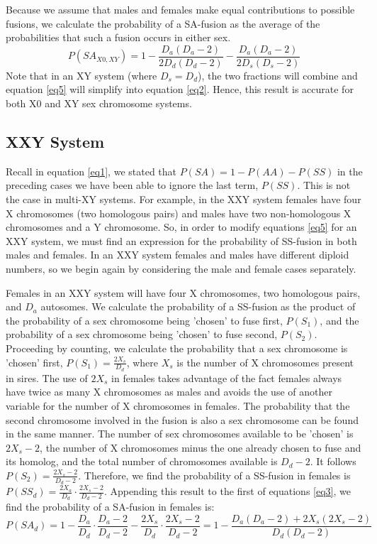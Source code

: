 \documentclass[12pt]{article}
\begin{document}
Because we assume that males and females make equal contributions to possible fusions, we calculate the probability of a SA-fusion as the average of the probabilities that such a fusion occurs in either sex.
    \begin{equation} \label{eq5}
        P(SA_{X0,XY}) = 1 - \frac{D_a  (D_a - 2)}{2 D_d  (D_d - 2)} - \frac{D_a  (D_a - 2)}{2 D_s  (D_s - 2)}
    \end{equation}
Note that in an XY system (where $D_s = D_d$), the two fractions will combine and equation \ref{eq5} will simplify into equation \ref{eq2}. 
Hence, this result is accurate for both X0 and XY sex chromosome systems.
 
\subsection{XXY System}
Recall in equation \ref{eq1}, we stated that $P(SA) = 1-P(AA)-P(SS)$ in the preceding cases we have been able to ignore the last term, $P(SS)$.
This is not the case in multi-XY systems.
For example, in the XXY system females have four X chromosomes (two homologous pairs) and males have two non-homologous X chromosomes and a Y chromosome.
So, in order to modify equations \ref{eq5} for an XXY system, we must find an expression for the probability of SS-fusion in both males and females. 
In an XXY system females and males have different diploid numbers, so we begin again by considering the male and female cases separately. 

Females in an XXY system will have four X chromosomes, two homologous pairs, and $D_a$ autosomes. 
We calculate the probability of a SS-fusion as the product of the probability of a sex chromosome being 'chosen' to fuse first, $P(S_1)$, and the probability of a sex chromosome being 'chosen' to fuse second, $P(S_2)$. 
Proceeding by counting, we calculate the probability that a sex chromosome is 'chosen' first,
$P(S_1) = \frac{2X_s}{D_d} $, where $X_s$ is the number of X chromosomes present in sires. 
The use of $2X_s$ in females takes advantage of the fact females always have twice as many X chromosomes as males and avoids the use of another variable for the number of X chromosomes in females.
The probability that the second chromosome involved in the fusion is also a sex chromosome can be found in the same manner. 
The number of sex chromosomes available to be 'chosen' is $2X_s - 2 $, the number of X chromosomes minus the one already chosen to fuse and its homolog, and the total number of chromosomes available is $D_d - 2$. 
It follows $P(S_2) = \frac{2X_s-2}{D_d-2}$. 
Therefore, we find the probability of a SS-fusion in females is  $P(SS_d) = \frac{2X_a}{D_d} \cdot \frac{2X_s-2}{D_d-2}$.
Appending this result to the first of equations \ref{eq3}, we find the probability of a SA-fusion in females is:
    \begin{equation} \label{eq6}
        P(SA_d) = 1 - \frac{D_a}{D_d} \cdot \frac{D_a - 2}{D_d - 2} -  \frac{2X_s}{D_d} \cdot \frac{2X_s-2}{D_d-2} = 1 - \frac{D_a(D_a-2) + 2X_s(2X_s-2)}{D_d(D_d-2)}
    \end{equation}
\end{document}
